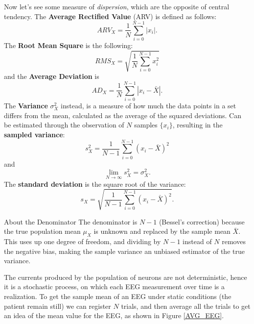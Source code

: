 \documentclass[10pt, letterpaper]{report}
\begin{document}
Now let's see some measure of \textit{dispersion}, which are the opposite of central tendency. The \textbf{Average Rectified Value} (ARV) is defined as follows:\begin{equation}
     ARV_X=\frac{1}{N}\sum_{i=0}^{N-1}|x_i|.
\end{equation}
The \textbf{Root Mean Square} is the following:\begin{equation}
     RMS_X=\sqrt{\frac{1}{N}\sum_{i=0}^{N-1} x_i^2}
\end{equation}
and the \textbf{Average Deviation} is\begin{equation}
     AD_X=\frac{1}{N}\sum_{i=0}^{N-1}|x_i-\bar X|.
\end{equation}
\noindent The \textbf{Variance} $\sigma_X^2$ instead, is a measure of how much the data points in a set differs from the mean, calculated as the average of the squared deviations. Can be estimated through the observation of $N$ samples $\{x_i\}$, resulting in the \textbf{sampled variance}:\begin{equation}
     s_X^2=\frac{1}{N-1}\sum_{i=0}^{N-1}(x_i-\bar X)^2
\end{equation}
and\begin{equation}
      \lim_{N\rightarrow \infty} s_X^2=\sigma_X^2.
\end{equation} 
The \textbf{standard deviation} is the square root of the variance:\begin{equation}
     s_X=\sqrt{\frac{1}{N-1}\sum_{i=0}^{N-1}(x_i-\bar X)^2}.
\end{equation}
\begin{boxobservation}{About the Denominator}{}
     The denominator is $N-1$ (Bessel's correction) because the true population mean $\mu_X$ is unknown and replaced by the sample mean $\bar{X}$. This uses up one degree of freedom, and dividing by $N-1$ instead of $N$ removes the negative bias, making the sample variance an unbiased estimator of the true variance.
\end{boxobservation}
The currents produced by the population of neurons are not deterministic, hence it is a stochastic process, on which each EEG measurement over time is a realization. To get the sample mean of an EEG under static conditions (the patient remain still) we can register $N$ trials, and then average all the trials to get an idea of the mean value for the EEG, as shown in Figure \ref{AVG_EEG}.
\bigskip
\end{document}
